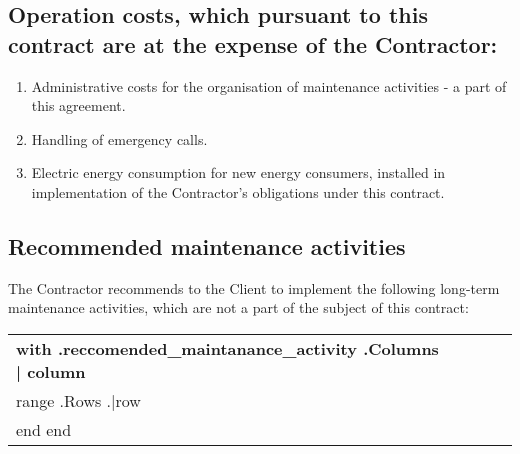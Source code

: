 \subsection{Operation costs, which pursuant to this contract are at
  the expense of the Contractor:}
\begin{enumerate}
\item Administrative costs for the organisation of maintenance
  activities {-} a part of this agreement.
\item Handling of emergency calls.
\item Electric energy consumption for new energy consumers, installed
  in implementation of the Contractor’s obligations under this
  contract.
\end{enumerate}

\subsection{Recommended maintenance activities}
The Contractor recommends to the Client to implement the following long-term maintenance activities, which are not a part of the subject of this contract:


\begin{center}
\begin{tabu}{|X[3]|X|X|X|X|} \tabucline{} \rowfont[c]\bfseries
{{with .reccomended_maintanance_activity}} %
	{{.Columns | column}} \\\tabucline{}
	{{range .Rows}} %
	{{.|row}} \\\tabucline{}
	{{end}}
        {{end}}
\end{tabu}
\end{center}

